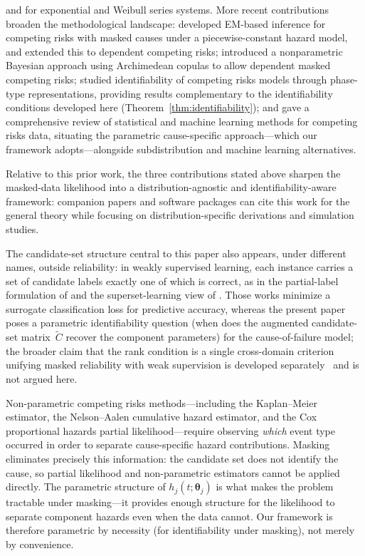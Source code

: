 \documentclass[11pt]{article}
\theoremstyle{definition}
\theoremstyle{plain}
\renewcommand{\v}[1]{\boldsymbol{#1}}
\begin{document}
\citet{lin1996} and \citet{kuo2000} for exponential and Weibull
series systems.
More recent contributions broaden the methodological landscape:
\citet{craiu2004} developed EM-based inference for competing risks with
masked causes under a piecewise-constant hazard model, and
\citet{craiu2006} extended this to dependent competing risks;
\citet{liu2021} introduced a nonparametric Bayesian approach using
Archimedean copulas to allow dependent masked competing risks;
\citet{lindqvist2023} studied identifiability of competing risks models
through phase-type representations, providing results complementary to
the identifiability conditions developed here
(Theorem~\ref{thm:identifiability}); and
\citet{monterrubio2024} gave a comprehensive review of statistical and
machine learning methods for competing risks data, situating the
parametric cause-specific approach---which our framework
adopts---alongside subdistribution and machine learning alternatives.

Relative to this prior work, the three contributions stated above
sharpen the masked-data likelihood into a distribution-agnostic and
identifiability-aware framework: companion papers and software packages
can cite this work for the general theory while focusing on
distribution-specific derivations and simulation studies.

The candidate-set structure central to this paper also appears, under
different names, outside reliability: in weakly supervised learning,
each instance carries a set of candidate labels exactly one of which is
correct, as in the partial-label formulation of \citet{cour2011partial}
and the superset-learning view of \citet{huellermeier2015superset}.
Those works minimize a surrogate classification loss for predictive
accuracy, whereas the present paper poses a parametric identifiability
question (when does the augmented candidate-set matrix~$\tilde{C}$
recover the component parameters) for the cause-of-failure model;
the broader claim that the rank condition is a single cross-domain
criterion unifying masked reliability with weak supervision is
developed separately~\citep{towell2026weaksupcoarsening} and is not
argued here.

Non-parametric competing risks methods---including the Kaplan--Meier
estimator, the Nelson--Aalen cumulative hazard estimator, and the
Cox proportional hazards partial likelihood---require observing
\emph{which} event type occurred in order to separate cause-specific
hazard contributions.
Masking eliminates precisely this information: the candidate set
does not identify the cause, so partial likelihood and non-parametric
estimators cannot be applied directly.
The parametric structure of $h_j(t; \v{\theta}_j)$ is what makes the
problem tractable under masking---it provides enough structure for
the likelihood to separate component hazards even when the data cannot.
Our framework is therefore parametric by necessity (for identifiability
under masking), not merely by convenience.
\end{document}
